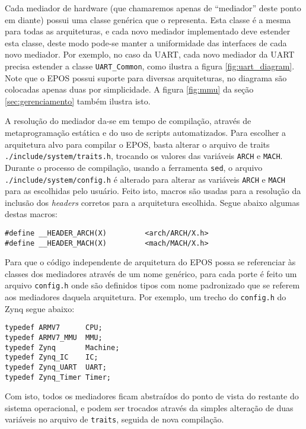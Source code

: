 
Cada mediador de hardware (que chamaremos apenas de ``mediador'' deste ponto em diante) possui uma classe genérica que o representa. Esta classe é a mesma para todas as arquiteturas, e cada novo mediador implementado deve estender esta classe, deste modo pode-se manter a uniformidade das interfaces de cada novo mediador. Por exemplo, no caso da UART, cada novo mediador da UART precisa estender a classe \verb+UART_Common+, como ilustra a figura \ref{fig:uart_diagram}. Note que o EPOS possui suporte para diversas arquiteturas, no diagrama são colocadas apenas duas por simplicidade. A figura \ref{fig:mmu} da seção \ref{sec:gerenciamento} também ilustra isto.


A resolução do mediador da-se em tempo de compilação, através de metaprogramação estática e do uso de scripts automatizados. Para escolher a arquitetura alvo para compilar o EPOS, basta alterar o arquivo de traits \verb+./include/system/traits.h+, trocando os valores das variáveis \verb+ARCH+ e \verb=MACH=. Durante o processo de compilação, usando a ferramenta \verb=sed=, o arquivo \verb=./include/system/config.h= é alterado para alterar as variáveis \verb+ARCH+ e \verb=MACH= para as escolhidas pelo usuário. Feito isto, macros são usadas para a resolução da inclusão dos \emph{headers} corretos para a arquitetura escolhida. Segue abaixo algumas destas macros:

\begin{verbatim}
#define __HEADER_ARCH(X)         <arch/ARCH/X.h>
#define __HEADER_MACH(X)         <mach/MACH/X.h>
\end{verbatim}

Para que o código independente de arquitetura do EPOS possa se referenciar às classes dos mediadores através de um nome genérico, para cada porte é feito um arquivo \verb=config.h= onde são definidos tipos com nome padronizado que se referem aos mediadores daquela arquitetura. Por exemplo, um trecho do \verb=config.h= do Zynq segue abaixo:

\begin{verbatim}
typedef ARMV7      CPU;
typedef ARMV7_MMU  MMU;
typedef Zynq       Machine;
typedef Zynq_IC    IC;
typedef Zynq_UART  UART;
typedef Zynq_Timer Timer;
\end{verbatim}

Com isto, todos os mediadores ficam abstraídos do ponto de vista do restante do sistema operacional, e podem ser trocados através da simples alteração de duas variáveis no arquivo de \verb=traits=, seguida de nova compilação.
